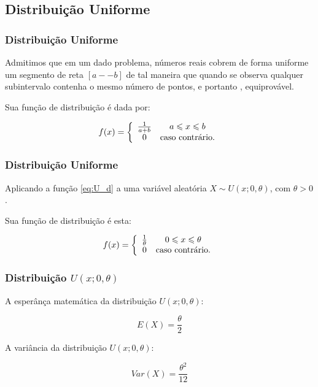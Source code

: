 \subsection{Distribuição Uniforme}
\begin{frame}
\frametitle{Distribui\c c\~ ao Uniforme}
Admitimos que em um dado problema, números reais cobrem de forma uniforme um segmento de reta $[a--b]$ de tal maneira que quando se observa qualquer subintervalo contenha o mesmo número de pontos, e portanto , equiprovável.

Sua função de distribuição é dada por:

\begin{equation}
\label{eq:U_d}
f(x) =
\left \{
\begin{array}{cc}
\frac{1}{ a + b } & a \leqslant x \leqslant b\\
0 & \textnormal{caso contrário.} \\
\end{array}
\right.
\end{equation}

\end{frame}

\begin{frame}
\frametitle{Distribui\c c\~ ao Uniforme}

Aplicando a função \ref{eq:U_d} a uma variável aleatória $X\sim U(x; 0,\theta)$, com $\theta>0$. 

Sua função de distribuição é esta:

\begin{displaymath}
f(x) =
\left \{
\begin{array}{cc}
\frac{1}{ \theta } & 0 \leqslant x \leqslant \theta\\
0 & \textnormal{caso contrário.} \\
\end{array}
\right.
\end{displaymath}


\end{frame}

\begin{frame}
\frametitle{Distribuição $U(x; 0,\theta)$}

A esperânça matemática da distribuição $U(x; 0,\theta)$:

\begin{equation}
\label{eq:U_esp}
E(X)=\dfrac{\theta}{2}
\end{equation}\pause

A variância da distribuição $U(x; 0,\theta)$:

\begin{equation}
\label{eq:U_var}
Var(X)=\dfrac{\theta^{2}}{12}
\end{equation}

\end{frame}

